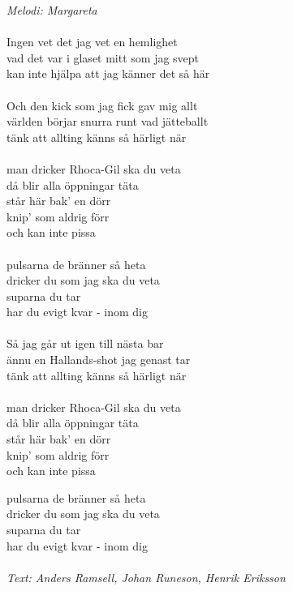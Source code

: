 {\footnotesize\textit{Melodi: Margareta}}\\
\\
Ingen vet det jag vet en hemlighet\\
vad det var i glaset mitt som jag svept\\
kan inte hjälpa att jag känner det så här\\
\\
Och den kick som jag fick gav mig allt\\
världen börjar snurra runt vad jätteballt\\
tänk att allting känns så härligt när\\
\\
man dricker Rhoca-Gil ska du veta \\
då blir alla öppningar täta\\
står här bak’ en dörr\\
knip’ som aldrig förr\\
och kan inte pissa\\
\\
pulsarna de bränner så heta\\
dricker du som jag ska du veta\\
suparna du tar\\
har du evigt kvar - inom dig\\
\\
Så jag går ut igen till nästa bar\\
ännu en Hallands-shot jag genast tar\\
tänk att allting känns så härligt när\\
\\
man dricker Rhoca-Gil ska du veta \\
då blir alla öppningar täta\\
står här bak’ en dörr\\
knip’ som aldrig förr\\
och kan inte pissa

pulsarna de bränner så heta\\
dricker du som jag ska du veta\\
suparna du tar \\
har du evigt kvar - inom dig\\
\\
{\footnotesize\textit{Text: Anders Ramsell, Johan Runeson, Henrik Eriksson}}
